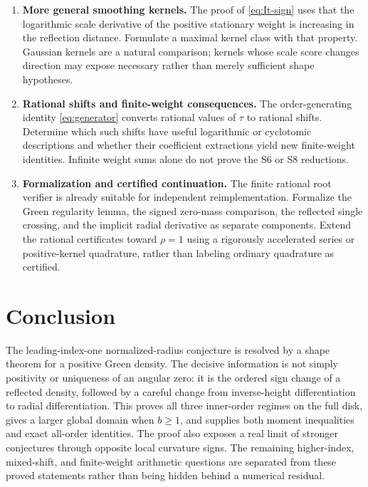 \documentclass[11pt]{article}
\numberwithin{equation}{section}
\theoremstyle{definition}
\theoremstyle{remark}
\begin{document}
\begin{enumerate}[leftmargin=*,itemsep=7pt]
\item \textbf{More general smoothing kernels.} The proof of
\eqref{eq:It-sign} uses that the logarithmic scale derivative of the
positive stationary weight is increasing in the reflection distance.
Formulate a maximal kernel class with that property. Gaussian kernels
are a natural comparison; kernels whose scale score changes direction
may expose necessary rather than merely sufficient shape hypotheses.

\item \textbf{Rational shifts and finite-weight consequences.}
The order-generating identity \eqref{eq:generator} converts rational
values of $\tau$ to rational shifts. Determine which such shifts have
useful logarithmic or cyclotomic descriptions and whether their
coefficient extractions yield new finite-weight identities. Infinite
weight sums alone do not prove the S6 or S8 reductions.

\item \textbf{Formalization and certified continuation.}
The finite rational root verifier is already suitable for independent
reimplementation. Formalize the Green regularity lemma, the signed
zero-mass comparison, the reflected single crossing, and the implicit
radial derivative as separate components. Extend the rational
certificates toward $\rho=1$ using a rigorously accelerated series or
positive-kernel quadrature, rather than labeling ordinary quadrature
as certified.
\end{enumerate}

\section{Conclusion}
The leading-index-one normalized-radius conjecture is resolved by a
shape theorem for a positive Green density. The decisive information
is not simply positivity or uniqueness of an angular zero: it is the
ordered sign change of a reflected density, followed by a careful
change from inverse-height differentiation to radial differentiation.
This proves all three inner-order regimes on the full disk, gives a
larger global domain when $b\ge1$, and supplies both moment inequalities
and exact all-order identities. The proof also exposes a real limit of
stronger conjectures through opposite local curvature signs. The
remaining higher-index, mixed-shift, and finite-weight arithmetic
questions are separated from these proved statements rather than
being hidden behind a numerical residual.
\end{document}
